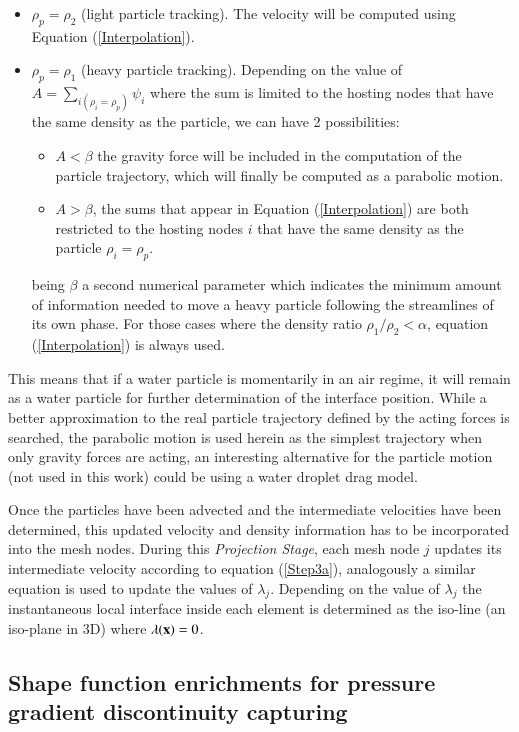  \begin{itemize}
    \item $\rho_p=\rho_2$ (light particle tracking). The velocity will be computed using Equation (\ref{Interpolation}).
    \item $\rho_p=\rho_1$ (heavy particle tracking). Depending on the value of $A=\sum_{i(\rho_i=\rho_p)}\psi_i$ where the sum is limited to the hosting nodes that have the same density as the particle, we can have 2 possibilities:
    \begin{itemize}
      \item $A<\beta$  the gravity force will be included in the computation of the particle trajectory, which will finally be computed as a parabolic motion.
      \item $A>\beta$, the sums that appear in Equation (\ref{Interpolation}) are both restricted to the hosting nodes $i$ that have the same density as the particle $\rho_i=\rho_p$.
    \end{itemize}
    being $\beta$ a second numerical parameter which indicates the minimum amount of information needed to move a heavy particle following the streamlines of its own phase. For those cases where the density ratio $\rho_1/\rho_2<\alpha$, equation (\ref{Interpolation}) is always used.
 \end{itemize}

This means that if a water particle is momentarily in an air regime, it will remain as a water particle for further determination of the interface position. While a better approximation to the real particle trajectory defined by the acting forces is searched, the parabolic motion is used herein as the simplest trajectory when only gravity forces are acting, an interesting alternative for the particle motion (not used in this work) could be using a water droplet drag model.

Once the particles have been advected and the intermediate velocities have been determined, this updated velocity and density information has to be incorporated into the mesh nodes. During this \textit{Projection Stage}, each mesh node $j$ updates its intermediate velocity according to equation (\ref{Step3a}), analogously a similar equation is used to update the values of $\lambda_j$. Depending on the value of $\lambda_j$ the instantaneous local interface inside each element is determined as the iso-line (an iso-plane in 3D) where $\lambda(\mathbf{x})=0$.

\subsection[Enriched Shape Functions]{Shape function enrichments for pressure gradient discontinuity capturing}

